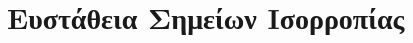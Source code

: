 






\setcounter{chapter}{1}

    
\section*{\textcolor{Col1}{Ευστάθεια Σημείων Ισορροπίας}}


\vspace{\baselineskip}


\vspace{\baselineskip}



